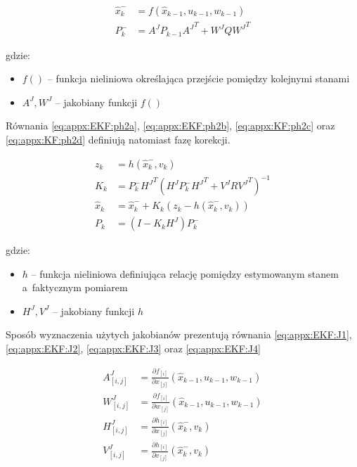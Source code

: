 \begin{subequations}
	\begin{align}
		\widehat{x}^-_k & = f(\widehat{x}_{k-1}, u_{k-1}, w_{k-1})\label{eq:appx:EKF:ph1a} \\
		P^-_k           & = A^J P_{k-1} {A^J}^T + W^J Q {W^J}^T \label{eq:appx:EKF:ph1b}   
	\end{align}
\end{subequations}

gdzie:
\begin{itemize}
	\item $f()$ -- funkcja nieliniowa określająca przejście pomiędzy kolejnymi stanami
	\item $A^J , W^J$ -- jakobiany funkcji $f()$
\end{itemize}

Równania \eqref{eq:appx:EKF:ph2a}, \eqref{eq:appx:EKF:ph2b}, \eqref{eq:appx:KF:ph2c} oraz \eqref{eq:appx:KF:ph2d} definiują natomiast fazę korekcji.

\begin{subequations}
	\begin{align}
		z_k           & = h(\widehat{x}^-_k, v_k) \label{eq:appx:EKF:ph2a}                                 \\
		K_k           & = P^-_{k}{H^J}^T(H^J P^-_{k}{H^J}^T + V^J R {V^J}^T)^{-1} \label{eq:appx:EKF:ph2b} \\
		\widehat{x}_k & = \widehat{x}^-_k + K_{k}(z_k-h(\widehat{x}^-_k, v_k))  \label{eq:appx:EKF:ph2c}   \\
		P_k           & = (I-K_{k}H^J)P^-_k \label{eq:appx:EKF:ph2d}                                       
	\end{align}
\end{subequations}

gdzie:
\begin{itemize}
	\item $h$ -- funkcja nieliniowa definiująca relację pomiędzy estymowanym stanem a~faktycznym pomiarem
	\item $H^J, V^J$ -- jakobiany funkcji $h$
\end{itemize}

Sposób wyznaczenia użytych jakobianów prezentują równania \eqref{eq:appx:EKF:J1}, \eqref{eq:appx:EKF:J2}, \eqref{eq:appx:EKF:J3} oraz \eqref{eq:appx:EKF:J4}

\begin{subequations}
	\begin{align}
		A^J_{[i, j]} & = \frac{\partial f_{[i]}}{\partial x_{[j]}}(\widehat{x}_{k-1}, u_{k-1}, w_{k-1}) \label{eq:appx:EKF:J1} \\
		W^J_{[i, j]} & = \frac{\partial f_{[i]}}{\partial w_{[j]}}(\widehat{x}_{k-1}, u_{k-1}, w_{k-1}) \label{eq:appx:EKF:J2} \\
		H^J_{[i, j]} & = \frac{\partial h_{[i]}}{\partial x_{[j]}}(\widehat{x}^-_k, v_k) \label{eq:appx:EKF:J3}                \\
		V^J_{[i, j]} & = \frac{\partial h_{[i]}}{\partial v_{[j]}}(\widehat{x}^-_k, v_k) \label{eq:appx:EKF:J4}                
	\end{align}
\end{subequations}

